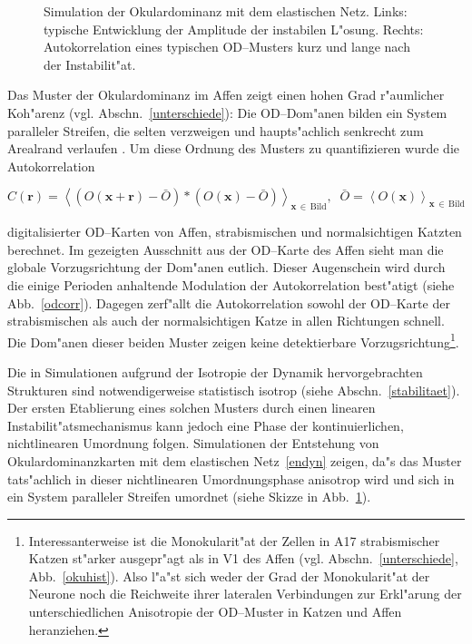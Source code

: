 \begin{figure}[t]
\begin{center}
\end{center}
\caption{Simulation der Okulardominanz mit dem elastischen Netz. Links:
typische Entwicklung der Amplitude der instabilen L"osung. Rechts:
Autokorrelation eines typischen OD--Musters kurz und lange nach der
Instabilit"at.}
\label{umordnung}
\end{figure}

Das Muster der Okulardominanz im Affen zeigt einen hohen Grad r"aumlicher
Koh"arenz (vgl. Abschn.~\ref{unterschiede}): Die OD--Dom"anen bilden ein
System paralleler Streifen, die selten verzweigen und haupts"achlich
senkrecht zum Arealrand verlaufen . Um diese Ordnung des Musters zu quantifizieren wurde die
Autokorrelation

\begin{small}
\begin{equation}
C(\mathbf{r})=\left<\left(O(\mathbf{x+r})-\bar{O}\right)\ast\left(O(\mathbf{x})-\bar{O}\right)\right>_{\mathbf{x}\,\in\,\text{Bild}},\;\;\bar{O}=\left<O(\mathbf{x})\right>_{\mathbf{x}\,\in\,\text{Bild}}
\label{autocorr} 
\end{equation}
\end{small}

\noindent digitalisierter OD--Karten von Affen, strabismischen und
normalsichtigen Katzten berechnet.  Im gezeigten Ausschnitt aus der
OD--Karte des Affen sieht man die globale Vorzugsrichtung der Dom"anen
eutlich.  Dieser Augenschein wird durch die einige Perioden anhaltende
Modulation der Autokorrelation best"atigt (siehe Abb.~\ref{odcorr}).
Dagegen zerf"allt die Autokorrelation sowohl der OD--Karte der
strabismischen als auch der normalsichtigen Katze in allen Richtungen
schnell. Die Dom"anen dieser beiden Muster zeigen keine detektierbare
Vorzugsrichtung\footnote{Interessanterweise ist die Monokularit"at der
Zellen in A17 strabismischer Katzen st"arker ausgepr"agt als in V1 des
Affen (vgl. Abschn.~\ref{unterschiede}, Abb.~\ref{okuhist}).  Also l"a"st
sich weder der Grad der Monokularit"at der Neurone noch die Reichweite
ihrer lateralen Verbindungen zur Erkl"arung der unterschiedlichen
Anisotropie der OD--Muster in Katzen und Affen heranziehen.}.
\setcounter{footnote}{1}

Die in Simulationen aufgrund der Isotropie der Dynamik
hervorgebrachten Strukturen sind notwendigerweise statistisch isotrop
(siehe Abschn.~\ref{stabilitaet}).  Der ersten Etablierung eines solchen
Musters durch einen linearen Instabilit"atsmechanismus kann jedoch 
eine Phase der kontinuierlichen, nichtlinearen Umordnung folgen.  Simulationen der Entstehung von Okulardominanzkarten mit
dem elastischen Netz~\eqref{endyn} zeigen, da"s das Muster tats"achlich in
dieser nichtlinearen Umordnungsphase anisotrop wird und sich in ein System
paralleler Streifen umordnet (siehe Skizze in
Abb.~\ref{umordnung}).

